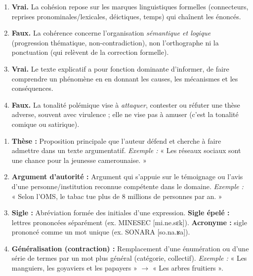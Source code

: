 \documentclass[11pt]{article}
\newcommand{\cle}[1]{{\popxbold\color{popdark}#1}}
\begin{document}
\begin{corrige}
\begin{enumerate}
\item \textbf{Vrai.} La cohésion repose sur les marques linguistiques formelles (connecteurs, reprises pronominales/lexicales, déictiques, temps) qui chaînent les énoncés.
\item \textbf{Faux.} La cohérence concerne l'organisation \emph{sémantique et logique} (progression thématique, non-contradiction), non l'orthographe ni la ponctuation (qui relèvent de la correction formelle).
\item \textbf{Vrai.} Le texte explicatif a pour fonction dominante d'informer, de faire comprendre un phénomène en en donnant les causes, les mécanismes et les conséquences.
\item \textbf{Faux.} La tonalité \cle{polémique} vise à \emph{attaquer}, contester ou réfuter une thèse adverse, souvent avec virulence ; elle ne vise pas à amuser (c'est la tonalité \cle{comique} ou \cle{satirique}).
\end{enumerate}
\end{corrige}

\begin{corrige}
\begin{enumerate}
\item \textbf{Thèse :} Proposition principale que l'auteur défend et cherche à faire admettre dans un texte argumentatif. \textit{Exemple :} « Les réseaux sociaux sont une chance pour la jeunesse camerounaise. »
\item \textbf{Argument d'autorité :} Argument qui s'appuie sur le témoignage ou l'avis d'une personne/institution reconnue compétente dans le domaine. \textit{Exemple :} « Selon l'OMS, le tabac tue plus de 8 millions de personnes par an. »
\item \textbf{Sigle :} Abréviation formée des initiales d'une expression. \textbf{Sigle épelé :} lettres prononcées séparément (ex. \cle{MINESEC} [mi.ne.sɛk]). \textbf{Acronyme :} sigle prononcé comme un mot unique (ex. \cle{SONARA} [so.na.ʁa]).
\item \textbf{Généralisation (contraction) :} Remplacement d'une énumération ou d'une série de termes par un mot plus général (catégorie, collectif). \textit{Exemple :} « Les manguiers, les goyaviers et les papayers » $\rightarrow$ « Les arbres fruitiers ».
\end{enumerate}
\end{corrige}
\end{document}
